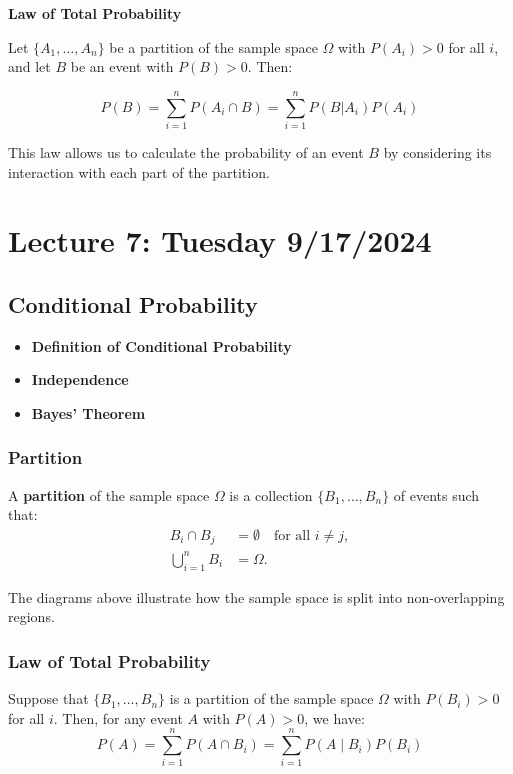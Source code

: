 \documentclass{article}
\begin{document}
    \textbf{Law of Total Probability}

    Let $\{A_1, \ldots, A_n\}$ be a partition of the sample space $\Omega$ with $P(A_i) > 0$ for all $i$, and let $B$ be an event with $P(B) > 0$. Then:

    \begin{equation*}
    P(B) = \sum_{i=1}^n P(A_i \cap B) = \sum_{i=1}^n P(B|A_i)P(A_i)
    \end{equation*}

    This law allows us to calculate the probability of an event $B$ by considering its interaction with each part of the partition.


    \section*{Lecture 7: Tuesday 9/17/2024}

    \subsection*{Conditional Probability}

    \begin{itemize}
        \item \textbf{Definition of Conditional Probability}
        \item \textbf{Independence}
        \item \textbf{Bayes' Theorem}
    \end{itemize}

    \subsubsection*{Partition}
    A \textbf{partition} of the sample space \(\Omega\) is a collection \( \{B_1, \dots, B_n\} \) of events such that:
    \begin{align*}
        B_i \cap B_j &= \emptyset \quad \text{for all } i \neq j, \\
        \bigcup_{i=1}^{n} B_i &= \Omega.
    \end{align*}

    The diagrams above illustrate how the sample space is split into non-overlapping regions.

    \subsubsection*{Law of Total Probability}
    Suppose that \( \{B_1, \dots, B_n\} \) is a partition of the sample space \(\Omega\) with \( P(B_i) > 0 \) for all \(i\). Then, for any event \( A \) with \( P(A) > 0 \), we have:
    \[
        P(A) = \sum_{i=1}^{n} P(A \cap B_i) = \sum_{i=1}^{n} P(A \mid B_i) P(B_i)
    \]
\end{document}
